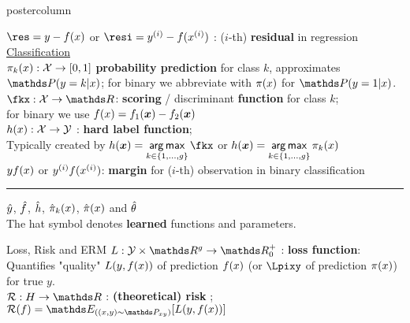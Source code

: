 \documentclass{beamer}
\begin{document}
\begin{frame}[fragile]{}
\begin{columns}
\begin{column}{.31\textwidth}
\begin{beamercolorbox}[center]{postercolumn}
\begin{minipage}{.98\textwidth}
{\begin{myblock}{}
$\res = y - \fx$ or $\resi = \yi - \fxi$ : ($i$-th) \textbf{residual} in regression\\



\underline{Classification}\\

$\pi_k(x) : \mathcal{X} \rightarrow [0,1]$ \textbf{probability prediction} for class $k$, approximates $\postk$;
for binary we abbreviate with $\pi(x)$ for $\post$.\\
 
$\fkx: \Xspace \rightarrow \R$: \textbf{scoring} / discriminant \textbf{function} for class $k$;\\
for binary we use $f(x) = f_{1}(\bm{x}) - f_{2}(\bm{x})$\\
 
$h(x): \mathcal{X} \rightarrow \mathcal{Y}$ : \textbf{hard label function};\\ 
Typically created by $h(\xv) = \argmax \limits_{k \in \gset} \fkx$ or $h(\bm{x}) = \mathop{\sf arg\,max} \limits_{k \in \{1, \ldots, g\}} \pi_k(x)$  \\

$y f(x)$ or $y^{(i)} f(x^{(i)})$: \textbf{margin} for ($i$-th) observation in binary classification\\%


\hrule width7cm
\vspace{1cm}

$\hat{y}$, $\hat{f}$, $\hat{h}$, $\hat \pi_k(x)$, $\hat \pi(x)$ and $\hat{\theta}$ \\
The hat symbol denotes \textbf{learned} functions and parameters.

\end{myblock}

\begin{myblock}{Loss, Risk and ERM}
  $L: \Yspace \times \R^g \to \R^+_0$ : \textbf{loss function}: 
 Quantifies "quality" $L(y, f(x))$ of prediction $f(x)$ (or $\Lpixy$ of prediction $\pi(x)$) for true $y$. \\

 $\risk:  \Hspace \to \R $ : \textbf{(theoretical) risk }; 
$\riskf = \E_{(\xy \sim \Pxy)}[\Lxy]$\\ 
  

\end{myblock}}
\end{minipage}
\end{beamercolorbox}
\end{column}
\end{columns}
\end{frame}
\end{document}
